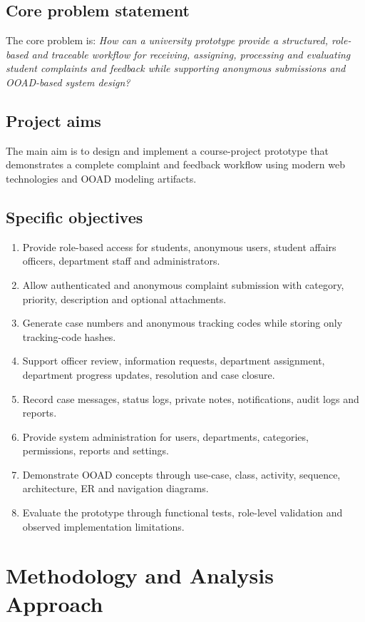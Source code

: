 \documentclass[11pt,a4paper]{article}
\begin{document}
\subsection{Core problem statement}
The core problem is: \textit{How can a university prototype provide a structured, role-based and traceable workflow for receiving, assigning, processing and evaluating student complaints and feedback while supporting anonymous submissions and OOAD-based system design?}

\subsection{Project aims}
The main aim is to design and implement a course-project prototype that demonstrates a complete complaint and feedback workflow using modern web technologies and OOAD modeling artifacts.

\subsection{Specific objectives}
\begin{enumerate}
  \item Provide role-based access for students, anonymous users, student affairs officers, department staff and administrators.
  \item Allow authenticated and anonymous complaint submission with category, priority, description and optional attachments.
  \item Generate case numbers and anonymous tracking codes while storing only tracking-code hashes.
  \item Support officer review, information requests, department assignment, department progress updates, resolution and case closure.
  \item Record case messages, status logs, private notes, notifications, audit logs and reports.
  \item Provide system administration for users, departments, categories, permissions, reports and settings.
  \item Demonstrate OOAD concepts through use-case, class, activity, sequence, architecture, ER and navigation diagrams.
  \item Evaluate the prototype through functional tests, role-level validation and observed implementation limitations.
\end{enumerate}

\section{Methodology and Analysis Approach}
\end{document}

